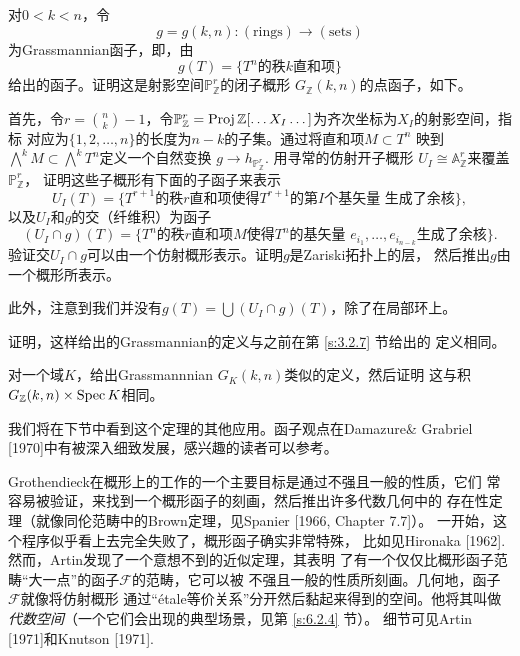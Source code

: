 \begin{exe}\label{exe:6.18}
对$0<k<n$，令
\[
g=g(k,n):(\text{rings})\to (\text{sets})    
\]
为Grassmannian函子，即，由
\[
    g(T)=\{\text{$T^n$的秩$k$直和项}\}
\]
给出的函子。证明这是射影空间$\mathbb P_{\mathbb Z}^r$的闭子概形
$G_{\mathbb Z}(k,n)$的点函子，如下。

首先，令$r= {n \choose k}-1$，令$\mathbb P_{\mathbb Z}^r
=\operatorname{Proj} \mathbb Z[\dots X_I \dots]$为齐次坐标为$X_I$的射影空间，指标
对应为$\{1,2,\dots,n\}$的长度为$n-k$的子集。通过将直和项$M\subset T^n$
映到$\bigwedge^k M\subset \bigwedge^k T^n$定义一个自然变换
$g\to h_{\mathbb P_{\mathbb Z}^r}$. 用寻常的仿射开子概形
$U_I\cong \mathbb A_{\mathbb Z}^r$来覆盖$\mathbb P_{\mathbb Z}^r$，
证明这些子概形有下面的子函子来表示
\[
    U_I(T)=\{\text{$T^{r+1}$的秩$r$直和项使得$T^{r+1}$的第$I$个基矢量
    生成了余核}\},
\]
以及$U_I$和$g$的交（纤维积）为函子
\[
    (U_I\cap g)(T)=\{\text{$T^{n}$的秩$r$直和项$M$使得$T^{n}$的基矢量
    $e_{i_1},\dots,e_{i_{n-k}}$生成了余核}\}.
\]
验证交$U_I\cap g$可以由一个仿射概形表示。证明$g$是Zariski拓扑上的层，
然后推出$g$由一个概形所表示。
\end{exe}

此外，注意到我们并没有$g(T)=\bigcup (U_I\cap g)(T)$，除了在局部环上。

\begin{exe}\label{exe:6.19}
证明，这样给出的Grassmannian的定义与之前在第 \ref{s:3.2.7} 节给出的
定义相同。
\end{exe}

\begin{exe}\label{exe:6.20}
    对一个域$K$，给出Grassmannnian $G_K(k,n)$类似的定义，然后证明
    这与积$G_{\mathbb Z}(k,n)\times \operatorname{Spec} K$相同。
\end{exe}

我们将在下节中看到这个定理的其他应用。函子观点在Damazure\& Grabriel
[1970]中有被深入细致发展，感兴趣的读者可以参考。

Grothendieck在概形上的工作的一个主要目标是通过不强且一般的性质，它们
常容易被验证，来找到一个概形函子的刻画，然后推出许多代数几何中的
存在性定理（就像同伦范畴中的Brown定理，见Spanier [1966, Chapter 7.7]）。
一开始，这个程序似乎看上去完全失败了，概形函子确实非常特殊，
比如见Hironaka [1962]. 然而，Artin发现了一个意想不到的近似定理，其表明%
了有一个仅仅比概形函子范畴“大一点”的函子$\mathscr F$的范畴，它可以被
不强且一般的性质所刻画。几何地，函子$\mathscr F$就像将仿射概形
通过“\'etale等价关系”分开然后黏起来得到的空间。他将其叫做
\emph{代数空间}（一个它们会出现的典型场景，见第 \ref{s:6.2.4} 节）。
细节可见Artin [1971]和Knutson [1971].

